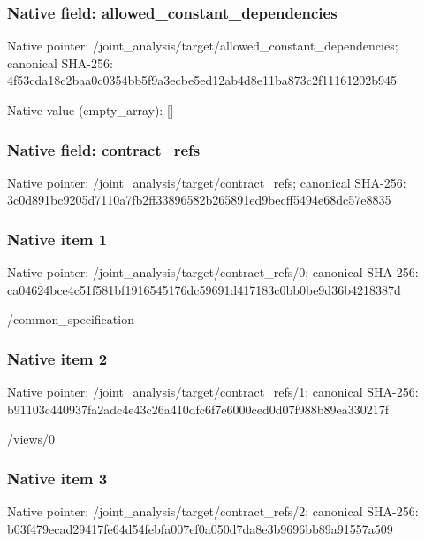 \documentclass[10pt,a4paper]{article}
\begin{document}
\subsubsection{Native field: allowed\_\allowbreak{}constant\_\allowbreak{}dependencies}
Native pointer: /joint\_\allowbreak{}analysis/target/allowed\_\allowbreak{}constant\_\allowbreak{}dependencies; canonical SHA-256: 4f53cda18c2baa0c0354bb5f9a3ecbe5ed12ab4d8e11ba873c2f11161202b945

Native value (empty\_\allowbreak{}array): []

\subsubsection{Native field: contract\_\allowbreak{}refs}
Native pointer: /joint\_\allowbreak{}analysis/target/contract\_\allowbreak{}refs; canonical SHA-256: 3c0d891bc9205d7110a7fb2ff33896582b265891ed9becff5494e68dc57e8835

\subsubsection{Native item 1}
Native pointer: /joint\_\allowbreak{}analysis/target/contract\_\allowbreak{}refs/0; canonical SHA-256: ca04624bce4c51f581bf1916545176dc59691d417183c0bb0be9d36b4218387d

\begingroup\raggedright\sloppy /\allowbreak{}common\_\allowbreak{}specification\par\endgroup

\subsubsection{Native item 2}
Native pointer: /joint\_\allowbreak{}analysis/target/contract\_\allowbreak{}refs/1; canonical SHA-256: b91103c440937fa2adc4e43c26a410dfc6f7e6000ced0d07f988b89ea330217f

\begingroup\raggedright\sloppy /\allowbreak{}views/\allowbreak{}0\par\endgroup

\subsubsection{Native item 3}
Native pointer: /joint\_\allowbreak{}analysis/target/contract\_\allowbreak{}refs/2; canonical SHA-256: b03f479ecad29417fe64d54febfa007ef0a050d7da8e3b9696bb89a91557a509
\end{document}
